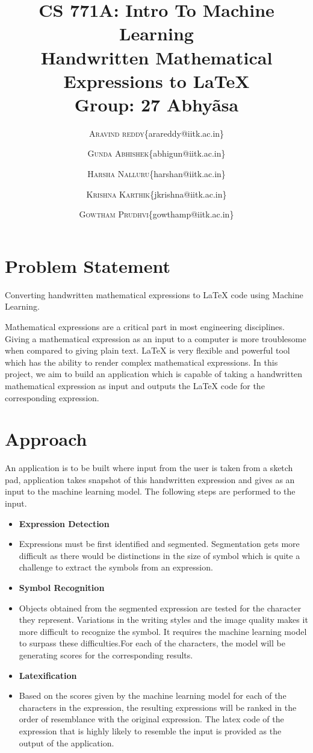 \documentclass[11pt]{article}
\title{\textbf{CS 771A: Intro To Machine Learning} \\Handwritten Mathematical Expressions to \LaTeX\\
\textbf{Group: 27 Abhyãsa}}
\author{ \textsc{Aravind reddy}\{arareddy@iitk.ac.in\} \and \textsc{Gunda Abhishek}\{abhigun@iitk.ac.in\} \\  \and \textsc{Harsha Nalluru}\{harshan@iitk.ac.in\} \and \textsc{Krishna Karthik}\{jkrishna@iitk.ac.in\} \and \textsc{Gowtham Prudhvi}\{gowthamp@iitk.ac.in\}}
\begin{document}
\maketitle
\section*{Problem Statement}
Converting handwritten mathematical expressions to LaTeX code using Machine Learning. \hfill \\
\par Mathematical expressions are a critical part in most engineering disciplines. Giving a mathematical expression as an input to a computer is more troublesome when compared to giving plain text. LaTeX is very flexible and powerful tool which has the ability to render complex mathematical expressions. In this project, we aim to build an application which is capable of taking a handwritten mathematical expression as input and outputs the LaTeX code for the corresponding expression.

\section*{Approach}
An application is to be built where input from the user is taken from a sketch pad, application takes snapshot of this handwritten expression and gives as an input to the machine learning model. The following steps are performed to the input.
\begin{itemize}
\item[]	\textbf{Expression Detection}
\vspace{-0.5em}
\item[] Expressions must be first identified and segmented. Segmentation\cite{chang} gets more difficult as there would be distinctions in the size of symbol which is quite a challenge to extract the symbols from an expression.
\item[]	\textbf{Symbol Recognition}
\vspace{-0.5em}
\item[] Objects obtained from the segmented expression are tested for the character they represent. Variations in the writing styles and the image quality makes it more difficult to recognize the symbol. It requires the machine learning model to surpass these difficulties.For each of the characters, the model will be generating scores for the corresponding results.
\item[] \textbf{Latexification}
\vspace{-0.5em}
\item[] Based on the scores given by the machine learning model for each of the characters in the expression, the resulting expressions will be ranked in the order of resemblance with the original expression. The latex code of the expression that is highly likely to resemble the input is provided as the output of the application.
\end{itemize}
\end{document}
